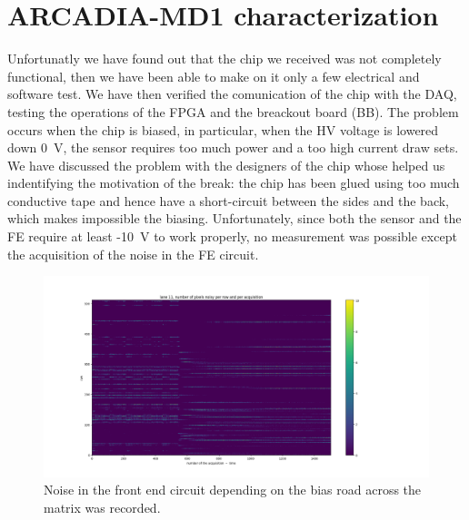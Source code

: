 \section{ARCADIA-MD1 characterization}
    Unfortunatly we have found out that the chip we received was not completely functional, then we have been able to make on it only a few electrical and software test. We have then verified the comunication of the chip with the DAQ, testing the operations of the FPGA and the breackout board (BB).  
    The problem occurs when the chip is biased, in particular, when the HV voltage is lowered down \SI{0}{V}, the sensor requires too much power and a too high current draw sets. We have discussed the problem with the designers of the chip whose helped us indentifying the motivation of the break: the chip has been glued using too much conductive tape and hence have a short-circuit between the sides and the back, which makes impossible the biasing.     
    Unfortunately, since both the sensor and the FE require at least -\SI{10}{V} to work properly, no measurement was possible except the acquisition of the noise in the FE circuit. 
    \begin{figure}[h!]
        \centering
        \includegraphics[width=.95\linewidth]{figures/charaterization/ARCADIA/pixel_per_row_per_acq_11_60.png}
        \caption{Noise in the front end circuit depending on the bias road across the matrix was recorded. }
        \label{fig:ARCADIA_threshold}
    \end{figure}

